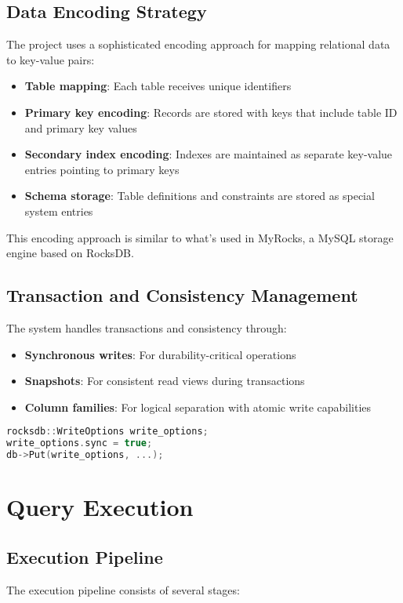\documentclass[12pt,a4paper]{article}
\begin{document}
\subsection{Data Encoding Strategy}
The project uses a sophisticated encoding approach for mapping relational data to key-value pairs:

\begin{itemize}
    \item \textbf{Table mapping}: Each table receives unique identifiers
    \item \textbf{Primary key encoding}: Records are stored with keys that include table ID and primary key values
    \item \textbf{Secondary index encoding}: Indexes are maintained as separate key-value entries pointing to primary keys
    \item \textbf{Schema storage}: Table definitions and constraints are stored as special system entries
\end{itemize}

This encoding approach is similar to what's used in MyRocks, a MySQL storage engine based on RocksDB.

\subsection{Transaction and Consistency Management}
The system handles transactions and consistency through:

\begin{itemize}
    \item \textbf{Synchronous writes}: For durability-critical operations
    \item \textbf{Snapshots}: For consistent read views during transactions
    \item \textbf{Column families}: For logical separation with atomic write capabilities
\end{itemize}

\begin{lstlisting}[language=C++,caption=Using synchronous writes in RocksDB]
rocksdb::WriteOptions write_options;
write_options.sync = true;
db->Put(write_options, ...);
\end{lstlisting}

\section{Query Execution}
\subsection{Execution Pipeline}
The execution pipeline consists of several stages:
\end{document}

